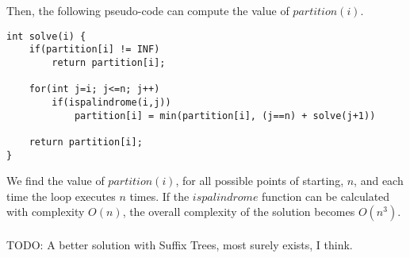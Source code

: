 \documentclass{article}
\begin{document}
Then, the following pseudo-code can compute the value of $partition(i)$.
\begin{verbatim}
int solve(i) {
    if(partition[i] != INF) 
        return partition[i];
		
    for(int j=i; j<=n; j++)
        if(ispalindrome(i,j))
            partition[i] = min(partition[i], (j==n) + solve(j+1))
    
    return partition[i];
}
\end{verbatim}
We find the value of $partition(i)$, for all possible points of starting, $n$, and each time the loop executes $n$ times. If the $ispalindrome$ function can be calculated with complexity $O(n)$, the overall complexity of the solution becomes $O(n^3)$.\\
\\
TODO: A better solution with Suffix Trees, most surely exists, I think.
\clearpage
\end{document}
